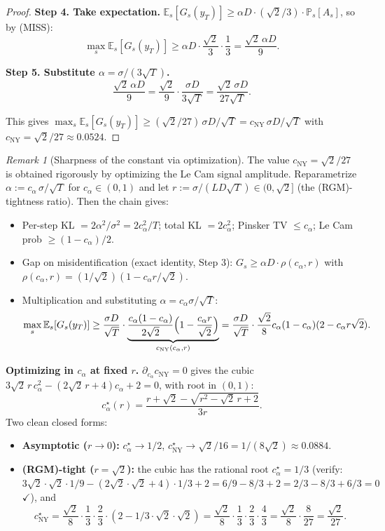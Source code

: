 \documentclass[11pt]{article}
\theoremstyle{definition}
\theoremstyle{remark}
\newtheorem{remark}[theorem]{Remark}
\begin{document}
\begin{proof}
\textbf{Step 4. Take expectation.} $\mathbb{E}_s[G_s(y_T)] \geq \alpha D \cdot (\sqrt 2/3) \cdot \mathbb{P}_s[A_s]$, so by (MISS):
\[
  \max_s \mathbb{E}_s[G_s(y_T)] \geq \alpha D \cdot \frac{\sqrt 2}{3} \cdot \frac{1}{3} = \frac{\sqrt 2\, \alpha D}{9}.
\]

\textbf{Step 5. Substitute $\alpha = \sigma/(3\sqrt T)$.}
\[
  \frac{\sqrt 2\, \alpha D}{9} = \frac{\sqrt 2}{9}\cdot \frac{\sigma D}{3\sqrt T} = \frac{\sqrt 2\, \sigma D}{27\sqrt T}.
\]

This gives $\max_s \mathbb{E}_s[G_s(y_T)] \geq (\sqrt 2/27)\,\sigma D/\sqrt T = c_{\mathrm{NY}}\,\sigma D/\sqrt T$ with $c_{\mathrm{NY}} = \sqrt 2/27 \approx 0.0524$.
\end{proof}

\begin{remark}[Sharpness of the constant via optimization]
The value $c_{\mathrm{NY}} = \sqrt 2/27$ is obtained rigorously by optimizing the Le Cam signal amplitude. Reparametrize $\alpha := c_\alpha\,\sigma/\sqrt T$ for $c_\alpha \in (0, 1)$ and let $r := \sigma/(LD\sqrt T) \in (0, \sqrt 2]$ (the (RGM)-tightness ratio). Then the chain gives:
\begin{itemize}
\item Per-step KL $= 2\alpha^2/\sigma^2 = 2c_\alpha^2/T$; total KL $= 2c_\alpha^2$; Pinsker TV $\leq c_\alpha$; Le Cam prob $\geq (1 - c_\alpha)/2$.
\item Gap on misidentification (exact identity, Step 3): $G_s \geq \alpha D \cdot \rho(c_\alpha, r)$ with $\rho(c_\alpha, r) = (1/\sqrt 2)(1 - c_\alpha r/\sqrt 2)$.
\item Multiplication and substituting $\alpha = c_\alpha \sigma/\sqrt T$:
\[
  \max_s \mathbb{E}_s[G_s(y_T)] \geq \frac{\sigma D}{\sqrt T}\cdot \underbrace{\frac{c_\alpha(1-c_\alpha)}{2\sqrt 2}\Bigl(1 - \frac{c_\alpha r}{\sqrt 2}\Bigr)}_{c_{\mathrm{NY}}(c_\alpha, r)} = \frac{\sigma D}{\sqrt T}\cdot \frac{\sqrt 2}{8} c_\alpha(1-c_\alpha)(2 - c_\alpha r\sqrt 2).
\]
\end{itemize}

\textbf{Optimizing in $c_\alpha$ at fixed $r$.} $\partial_{c_\alpha} c_{\mathrm{NY}} = 0$ gives the cubic $3\sqrt 2\, r\, c_\alpha^2 - (2\sqrt 2\, r + 4) c_\alpha + 2 = 0$, with root in $(0, 1)$:
\[
  c_\alpha^\star(r) = \frac{r + \sqrt 2 - \sqrt{r^2 - \sqrt 2\, r + 2}}{3 r}.
\]
Two clean closed forms:
\begin{itemize}
\item \textbf{Asymptotic ($r \to 0$):} $c_\alpha^\star \to 1/2$, $c_{\mathrm{NY}}^\star \to \sqrt 2/16 = 1/(8\sqrt 2) \approx 0.0884$.
\item \textbf{(RGM)-tight ($r = \sqrt 2$):} the cubic has the rational root $c_\alpha^\star = 1/3$ (verify: $3\sqrt 2 \cdot \sqrt 2 \cdot 1/9 - (2\sqrt 2 \cdot \sqrt 2 + 4) \cdot 1/3 + 2 = 6/9 - 8/3 + 2 = 2/3 - 8/3 + 6/3 = 0$ $\checkmark$), and
\[
  c_{\mathrm{NY}}^\star = \frac{\sqrt 2}{8}\cdot \frac{1}{3}\cdot \frac{2}{3}\cdot (2 - 1/3 \cdot \sqrt 2 \cdot \sqrt 2) = \frac{\sqrt 2}{8}\cdot \frac{1}{3}\cdot \frac{2}{3}\cdot \frac{4}{3} = \frac{\sqrt 2}{8}\cdot \frac{8}{27} = \frac{\sqrt 2}{27}.
\]
\end{itemize}


\end{remark}
\end{document}
